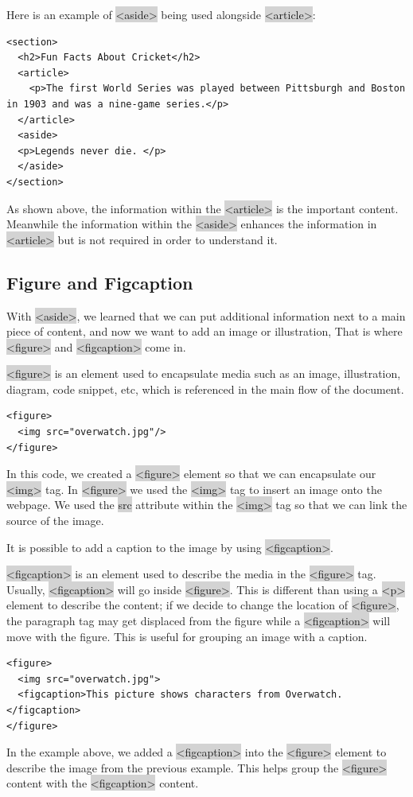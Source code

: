 \documentclass[11pt]{article}
\begin{document}
Here is an example of \colorbox{lightgray}{<aside>} being used alongside \colorbox{lightgray}{<article>}:
\begin{lstlisting}
<section>
  <h2>Fun Facts About Cricket</h2>
  <article>
    <p>The first World Series was played between Pittsburgh and Boston in 1903 and was a nine-game series.</p>
  </article>
  <aside>
  <p>Legends never die. </p>
  </aside>
</section>
\end{lstlisting}
As shown above, the information within the \colorbox{lightgray}{<article>} is the important content. Meanwhile the information within the \colorbox{lightgray}{<aside>} enhances the information in \colorbox{lightgray}{<article>} but is not required in order to understand it.

\subsection{Figure and Figcaption}
With \colorbox{lightgray}{<aside>}, we learned that we can put additional information next to a main piece of content, and now we want to add an image or illustration, That is where \colorbox{lightgray}{<figure>} and \colorbox{lightgray}{<figcaption>} come in.

\colorbox{lightgray}{<figure>} is an element used to encapsulate media such as an image, illustration, diagram, code snippet, etc, which is referenced in the main flow of the document.
\begin{lstlisting}
<figure>
  <img src="overwatch.jpg"/>
</figure>
\end{lstlisting}
In this code, we created a \colorbox{lightgray}{<figure>} element so that we can encapsulate our \colorbox{lightgray}{<img>} tag. In \colorbox{lightgray}{<figure>} we used the \colorbox{lightgray}{<img>} tag to insert an image onto the webpage. We used the \colorbox{lightgray}{src} attribute within the \colorbox{lightgray}{<img>} tag so that we can link the source of the image.

It is possible to add a caption to the image by using \colorbox{lightgray}{<figcaption>}.

\colorbox{lightgray}{<figcaption>} is an element used to describe the media in the \colorbox{lightgray}{<figure>} tag. Usually, \colorbox{lightgray}{<figcaption>} will go inside \colorbox{lightgray}{<figure>}. This is different than using a \colorbox{lightgray}{<p>} element to describe the content; if we decide to change the location of \colorbox{lightgray}{<figure>}, the paragraph tag may get displaced from the figure while a \colorbox{lightgray}{<figcaption>} will move with the figure. This is useful for grouping an image with a caption.
\begin{lstlisting}
<figure>
  <img src="overwatch.jpg">
  <figcaption>This picture shows characters from Overwatch.</figcaption>
</figure>
\end{lstlisting}
In the example above, we added a \colorbox{lightgray}{<figcaption>} into the \colorbox{lightgray}{<figure>} element to describe the image from the previous example. This helps group the \colorbox{lightgray}{<figure>} content with the \colorbox{lightgray}{<figcaption>} content.
\end{document}
